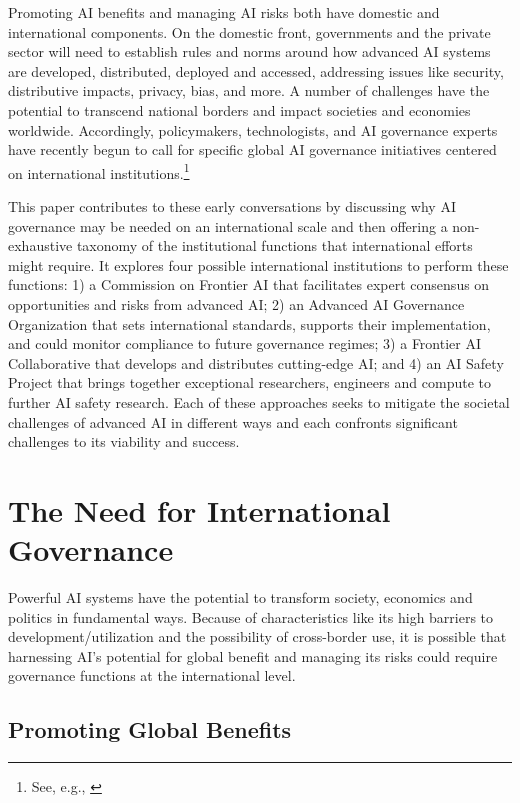 \documentclass[12pt]{article}
\begin{document}
Promoting AI benefits and managing AI risks both have domestic and
international components. On the domestic front, governments and the
private sector will need to establish rules and norms around how
advanced AI systems are developed, distributed, deployed and accessed,
addressing issues like security, distributive impacts, privacy, bias,
and more. A number of challenges have the potential to transcend
national borders and impact societies and economies worldwide.
Accordingly, policymakers, technologists, and AI governance experts have
recently begun to call for specific global AI governance initiatives
centered on international institutions.\footnote{See, e.g., \cite{noauthor_secretary-general_2023, noauthor_elders_2023, dubner_satya_nodate, rees_g20_2023, chowdhury_ai_2023, kakkad_new_2023, hogarth_we_2023}}

This paper contributes to these early conversations by discussing why AI
governance may be needed on an international scale and then offering a
non-exhaustive taxonomy of the institutional functions that
international efforts might require. It explores four possible
international institutions to perform these functions: 1) a Commission
on Frontier AI that facilitates expert consensus on opportunities and
risks from advanced AI; 2) an Advanced AI Governance Organization that
sets international standards, supports their implementation, and could
monitor compliance to future governance regimes; 3) a Frontier AI
Collaborative that develops and distributes cutting-edge AI; and 4) an
AI Safety Project that brings together exceptional researchers,
engineers and compute to further AI safety research. Each of these
approaches seeks to mitigate the societal challenges of advanced AI in
different ways and each confronts significant challenges to its
viability and success.


\section{The Need for International Governance
}

Powerful AI systems have the potential to transform society, economics
and politics in fundamental ways. Because of characteristics like its
high barriers to development/utilization and the possibility of
cross-border use, it is possible that harnessing AI's potential for
global benefit and managing its risks could require governance functions
at the international level.

\subsection*{Promoting Global Benefits}
\end{document}
